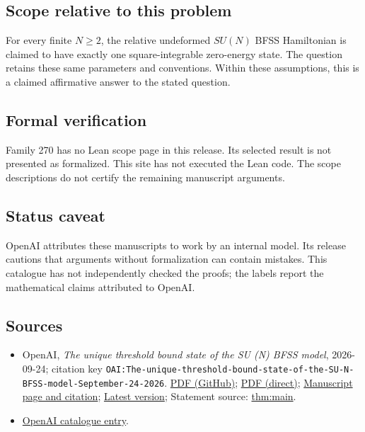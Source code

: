 \documentclass[11pt]{article}
\begin{document}
\subsection{Scope relative to this problem}
For every finite $N\geq2$, the relative undeformed $SU(N)$ BFSS Hamiltonian is claimed to have exactly one square-integrable zero-energy state. The question retains these same parameters and conventions. Within these assumptions, this is a claimed affirmative answer to the stated question.

\subsection{Formal verification}
Family 270 has no Lean scope page in this release. Its selected result is not presented as formalized. This site has not executed the Lean code. The scope descriptions do not certify the remaining manuscript arguments.

\subsection{Status caveat}
OpenAI attributes these manuscripts to work by an internal model. Its release cautions that arguments without formalization can contain mistakes. This catalogue has not independently checked the proofs; the labels report the mathematical claims attributed to OpenAI.

\subsection{Sources}
\begin{itemize}
\item OpenAI, \emph{The unique threshold bound state of the SU (N) BFSS model}, 2026-09-24; citation key \texttt{OAI:The-unique-threshold-bound-state-of-the-SU-N-BFSS-model-September-24-2026}. \href{https://github.com/openai/math/blob/adc7f1241b42e322a6451854ab7e4b4c146bf78a/preprints/The-unique-threshold-bound-state-of-the-SU-N-BFSS-model-September-24-2026/paper.pdf}{PDF (GitHub)}; \href{https://github.com/openai/math/raw/adc7f1241b42e322a6451854ab7e4b4c146bf78a/preprints/The-unique-threshold-bound-state-of-the-SU-N-BFSS-model-September-24-2026/paper.pdf}{PDF (direct)}; \href{https://github.com/openai/math/blob/adc7f1241b42e322a6451854ab7e4b4c146bf78a/preprints/The-unique-threshold-bound-state-of-the-SU-N-BFSS-model-September-24-2026/README.md}{Manuscript page and citation}; \href{https://github.com/openai/math/blob/main/preprints/The-unique-threshold-bound-state-of-the-SU-N-BFSS-model-September-24-2026/paper.pdf}{Latest version}; Statement source: \href{https://github.com/openai/math/blob/adc7f1241b42e322a6451854ab7e4b4c146bf78a/preprints/The-unique-threshold-bound-state-of-the-SU-N-BFSS-model-September-24-2026/build/manuscript/sections/01-introduction.tex\#L74}{thm:main}.
\item \href{https://github.com/openai/math/blob/adc7f1241b42e322a6451854ab7e4b4c146bf78a/CONTENTS.md}{OpenAI catalogue entry}.
\end{itemize}
\end{document}
